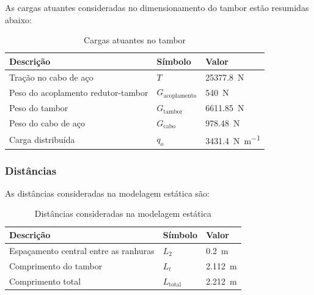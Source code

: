 As cargas atuantes consideradas no dimensionamento do tambor estão resumidas abaixo:

\begin{table}[H]
  \centering
  \caption{Cargas atuantes no tambor}
  \label{tab:cargas_atuantes_tambor}
  \begin{tabularx}{\textwidth}{>{\centering\arraybackslash}X>{\centering\arraybackslash}X>{\centering\arraybackslash}X}
    \toprule
    Descrição                          & Símbolo                  & Valor                          \\
    \midrule
    Tração no cabo de aço              & $T$                      & \SI{25377.8}{\newton}          \\
    Peso do acoplamento redutor-tambor & $G_{\text{acoplamento}}$ & \SI{540}{\newton}              \\
    Peso do tambor                     & $G_{\text{tambor}}$      & \SI{6611.85}{\newton}          \\
    Peso do cabo de aço                & $G_{\text{cabo}}$        & \SI{978.48}{\newton}           \\
    Carga distribuída                  & $q_o$                    & \SI{3431.4}{\newton\per\meter} \\
    \bottomrule
  \end{tabularx}
\end{table}

\subsubsection{Distâncias}

As distâncias consideradas na modelagem estática são:

\begin{table}[H]
  \centering
  \caption{Distâncias consideradas na modelagem estática}
  \label{tab:distancias_consideradas_modelagem_estatica}
  \begin{tabularx}{\textwidth}{>{\centering\arraybackslash}X>{\centering\arraybackslash}X>{\centering\arraybackslash}X}
    \toprule
    Descrição                             & Símbolo            & Valor              \\
    \midrule
    Espaçamento central entre as ranhuras & $L_2$              & \SI{0.2}{\meter}   \\
    Comprimento do tambor                 & $L_t$              & \SI{2.112}{\meter} \\
    Comprimento total                     & $L_{\text{total}}$ & \SI{2.212}{\meter} \\
    \bottomrule
  \end{tabularx}
\end{table}

